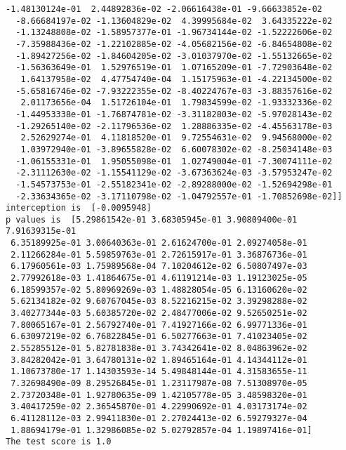 \documentclass[11pt]{article}
\begin{document}
\begin{Verbatim}[commandchars=\\\{\}]
  -1.48130124e-01  2.44892836e-02 -2.06616438e-01 -9.66633852e-02
  -8.66684197e-02 -1.13604829e-02  4.39995684e-02  3.64335222e-02
  -1.13248808e-02 -1.58957377e-01 -1.96734144e-02 -1.52222606e-02
  -7.35988436e-02 -1.22102885e-02 -4.05682156e-02 -6.84654808e-02
  -1.89427256e-02 -1.84604205e-02 -3.01037970e-02 -1.55132665e-02
  -1.56363649e-01  1.52976519e-01  1.07165209e-01 -7.72903648e-02
   1.64137958e-02  4.47754740e-04  1.15175963e-01 -4.22134500e-02
  -5.65816746e-02 -7.93222355e-02 -8.40224767e-03 -3.88357616e-02
   2.01173656e-04  1.51726104e-01  1.79834599e-02 -1.93332336e-02
  -1.44953338e-01 -1.76874781e-02 -3.31182803e-02 -5.97028143e-02
  -1.29265140e-02 -2.11796536e-02  1.28886335e-02 -4.45563178e-03
   2.52629274e-01  4.11818520e-01  9.72554631e-02  9.94568000e-02
   1.03972940e-01 -3.89655828e-02  6.60078302e-02 -8.25034148e-03
  -1.06155331e-01  1.95055098e-01  1.02749004e-01 -7.30074111e-02
  -2.31112630e-02 -1.15541129e-02 -3.67363624e-03 -3.57953247e-02
  -1.54573753e-01 -2.55182341e-02 -2.89288000e-02 -1.52694298e-01
  -2.33634365e-02 -3.17110798e-02 -1.04792557e-01 -1.70852698e-02]]
interception is  [-0.0095948]
p values is  [5.29861542e-01 3.68305945e-01 3.90809400e-01 7.91639315e-01
 6.35189925e-01 3.00640363e-01 2.61624700e-01 2.09274058e-01
 2.11266284e-01 5.59859763e-01 2.72615917e-01 3.36876736e-01
 6.17960561e-03 1.75989568e-04 7.10204612e-02 6.50807497e-03
 2.77992618e-03 1.41864675e-01 4.61191214e-03 1.19123025e-05
 6.18599357e-02 5.80969269e-03 1.48828054e-05 6.13160620e-02
 5.62134182e-02 9.60767045e-03 8.52216215e-02 3.39298288e-02
 3.40277344e-03 5.60385720e-02 2.48477006e-02 9.52650251e-02
 7.80065167e-01 2.56792740e-01 7.41927166e-02 6.99771336e-01
 6.63097219e-02 6.76822845e-01 6.50277663e-01 7.41023405e-02
 2.55285512e-01 5.82781838e-01 3.74342641e-02 8.04863962e-02
 3.84282042e-01 3.64780131e-02 1.89465164e-01 4.14344112e-01
 1.10673780e-17 1.14303593e-14 5.49848144e-01 4.31583655e-11
 7.32698490e-09 8.29526845e-01 1.23117987e-08 7.51308970e-05
 2.73720348e-01 1.92780635e-09 1.42105778e-05 3.48598320e-01
 3.40417259e-02 2.36545870e-01 4.22990692e-01 4.03173174e-02
 6.41128112e-03 2.99411830e-01 2.27024413e-02 6.59279327e-04
 1.88694179e-01 1.32986085e-02 5.02792857e-04 1.19897416e-01]
The test score is 1.0

    \end{Verbatim}

    \begin{center}
    \end{center}
    { \hspace*{\fill} \\}
    
\end{document}

